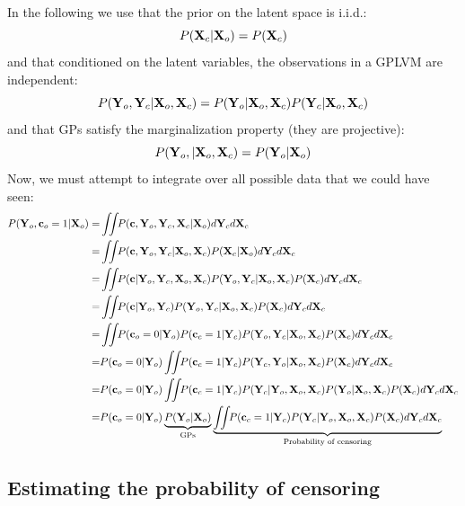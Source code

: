 \documentclass{article}
\begin{document}
\newcommand{\intlatent}{\int \!\!\!  \int \!\! }

In the following we use that the prior on the latent space is i.i.d.: $$P( \mathbf{X}_c | \mathbf{X}_o ) = P( \mathbf{X}_c )$$ 
and that conditioned on the latent variables, the observations in a GPLVM are independent:
$$ P( \mathbf{Y}_o, \mathbf{Y}_c | \mathbf{X}_o, \mathbf{X}_c ) = P( \mathbf{Y}_o | \mathbf{X}_o, \mathbf{X}_c ) P( \mathbf{Y}_c | \mathbf{X}_o, \mathbf{X}_c )$$ 
and that GPs satisfy the marginalization property (they are projective):
$$ P( \mathbf{Y}_o, | \mathbf{X}_o, \mathbf{X}_c ) = P( \mathbf{Y}_o | \mathbf{X}_o ) $$
%
Now, we must attempt to integrate over all possible data that we could have seen:
%
\begin{align}
P(\vY_o, \vc_o = 1 | \vX_o) = & \intlatent P( \vc, \vY_o, \vY_c, \vX_c | \vX_o ) d\vY_c d\vX_c \\
= & \intlatent P( \vc, \vY_o, \vY_c | \vX_o, \vX_c ) P( \vX_c | \vX_o ) d\vY_c d\vX_c \\
= & \intlatent P( \vc | \vY_o, \vY_c, \vX_o, \vX_c ) P( \vY_o, \vY_c | \vX_o, \vX_c ) P( \vX_c ) d\vY_c d\vX_c\\
= & \intlatent P( \vc | \vY_o, \vY_c) P( \vY_o, \vY_c | \vX_o, \vX_c ) P( \vX_c ) d\vY_c d\vX_c \\
= & \intlatent P( \vc_o = 0 | \vY_o ) P( \vc_c = 1 | \vY_c ) P( \vY_o, \vY_c | \vX_o, \vX_c )  P( \vX_c ) d\vY_c d\vX_c\\
= & P( \vc_o = 0 | \vY_o ) \intlatent P( \vc_c = 1 | \vY_c ) P( \vY_c, \vY_o | \vX_o, \vX_c ) P( \vX_c ) d\vY_c d\vX_c \\
= & P( \vc_o = 0 | \vY_o ) \intlatent P( \vc_c = 1 | \vY_c ) P( \vY_c | \vY_o, \vX_o, \vX_c ) P( \vY_o | \vX_o, \vX_c ) P( \vX_c ) d\vY_c d\vX_c \\
= & P( \vc_o = 0 | \vY_o ) \underbrace{P( \vY_o | \vX_o )}_{\textrm{GPs}} \underbrace{\intlatent P( \vc_c = 1 | \vY_c ) P( \vY_c | \vY_o, \vX_o, \vX_c) P(\vX_c) d\vY_c d\vX_c }_{\textrm{Probability of censoring}}
\label{eqn:full_censoring_likelihood}
\end{align}

\subsection{Estimating the probability of censoring}
\end{document}
